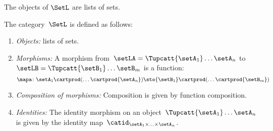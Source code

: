 The objects of $\SetL$ are lists of sets.
%
%

\begin{definition}
    \label{def:SetL}
    The category~$\SetL$ is defined as follows:
    \begin{enumerate}
        \item \emph{Objects:} lists of sets.
        \item \emph{Morphisms:}
              A morphism from~$\setLA =\Tupcatt {\setA_1}  \dots {\setA_n}$ to~$\setLB = \Tupcatt {\setB_1} \dots {\setB_m}$ is a function:
              \begin{equation*}
                  \mapa\colon {\setA_1} \cartprod (\ldots \cartprod {\setA_n}) \sto {\setB_1} \cartprod (\ldots \cartprod {\setB_m})
              \end{equation*}
        \item \emph{Composition of morphisms:}
              Composition is given by function composition.
        \item \emph{Identities:}
              The identity morphism on an object~$\Tupcatt {\setA_1} \dots {\setA_n}$ is given by the identity map~$\catid_{\setA_1\times \ldots \times \setA_n}$.
    \end{enumerate}
\end{definition}

